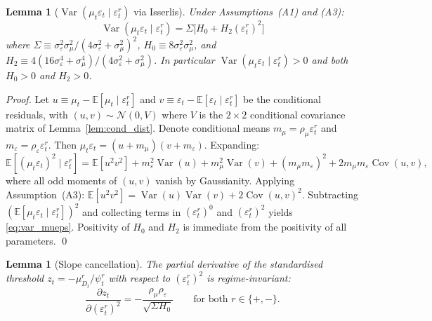 \documentclass[12pt,a4paper]{article}
\newtheorem{lemma}[theorem]{Lemma}
\theoremstyle{definition}
\begin{document}
\begin{lemma}[$\operatorname{Var}(\mu_t\varepsilon_t \mid
  \varepsilon^r_t)$ via Isserlis]
\label{lem:var_mueps}
Under Assumptions~(A1) and (A3):
\begin{equation}
  \operatorname{Var}(\mu_t\varepsilon_t \mid \varepsilon^r_t)
  = \Sigma\bigl[H_0 + H_2(\varepsilon^r_t)^2\bigr]
  \label{eq:var_mueps}
\end{equation}
where $\Sigma \equiv \sigma^2_\varepsilon\sigma^2_\mu /
(4\sigma^2_\varepsilon + \sigma^2_\mu)^2$,
$H_0 \equiv 8\sigma^2_\varepsilon\sigma^2_\mu$, and
$H_2 \equiv 4(16\sigma^4_\varepsilon + \sigma^4_\mu) /
(4\sigma^2_\varepsilon + \sigma^2_\mu)$. In particular
$\operatorname{Var}(\mu_t\varepsilon_t \mid \varepsilon^r_t) > 0$
and both $H_0 > 0$ and $H_2 > 0$.
\end{lemma}

\begin{proof}
Let $u \equiv \mu_t - \mathbb{E}[\mu_t \mid \varepsilon^r_t]$ and
$v \equiv \varepsilon_t - \mathbb{E}[\varepsilon_t \mid
\varepsilon^r_t]$ be the conditional residuals, with
$(u,v) \sim \mathcal{N}(0, V)$ where $V$ is the $2\times2$
conditional covariance matrix of Lemma~\ref{lem:cond_dist}. Denote
conditional means $m_\mu = \rho_\mu\varepsilon^r_t$ and
$m_\varepsilon = \rho_\varepsilon\varepsilon^r_t$. Then
$\mu_t\varepsilon_t = (u+m_\mu)(v+m_\varepsilon)$. Expanding:
\[
\mathbb{E}[(\mu_t\varepsilon_t)^2 \mid \varepsilon^r_t]
= \mathbb{E}[u^2v^2] + m^2_\varepsilon\operatorname{Var}(u)
  + m^2_\mu\operatorname{Var}(v)
  + (m_\mu m_\varepsilon)^2
  + 2m_\mu m_\varepsilon\operatorname{Cov}(u,v),
\]
where all odd moments of $(u,v)$ vanish by Gaussianity. Applying
Assumption~(A3): $\mathbb{E}[u^2v^2] = \operatorname{Var}(u)
\operatorname{Var}(v) + 2\operatorname{Cov}(u,v)^2$. Subtracting
$(\mathbb{E}[\mu_t\varepsilon_t \mid \varepsilon^r_t])^2$ and
collecting terms in $(\varepsilon^r_t)^0$ and $(\varepsilon^r_t)^2$
yields \eqref{eq:var_mueps}. Positivity of $H_0$ and $H_2$ is
immediate from the positivity of all parameters.
\qed
\end{proof}

\begin{lemma}[Slope cancellation]
\label{lem:slope_cancel}
The partial derivative of the standardised threshold $z_t =
-\mu^r_{D_t}/\psi^r_t$ with respect to $(\varepsilon^r_t)^2$ is
regime-invariant:
\[
\frac{\partial z_t}{\partial(\varepsilon^r_t)^2}
= -\frac{\rho_\mu\rho_\varepsilon}{\sqrt{\Sigma H_0}}
  \qquad \text{for both } r \in \{+,-\}.
\]
\end{lemma}
\end{document}
